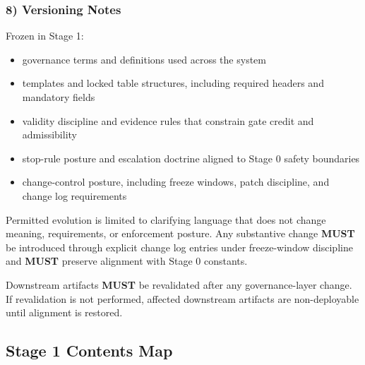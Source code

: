 \documentclass[10pt]{article}
\begin{document}
\subsubsection*{8) Versioning Notes}

Frozen in Stage 1:

\begin{itemize}
\item governance terms and definitions used across the system
\item templates and locked table structures, including required headers and mandatory fields
\item validity discipline and evidence rules that constrain gate credit and admissibility
\item stop-rule posture and escalation doctrine aligned to Stage 0 safety boundaries
\item change-control posture, including freeze windows, patch discipline, and change log requirements
\end{itemize}

Permitted evolution is limited to clarifying language that does not change meaning, requirements, or enforcement posture. Any substantive change \textbf{MUST} be introduced through explicit change log entries under freeze-window discipline and \textbf{MUST} preserve alignment with Stage 0 constants.

Downstream artifacts \textbf{MUST} be revalidated after any governance-layer change. If revalidation is not performed, affected downstream artifacts are non-deployable until alignment is restored.

\subsection*{Stage 1 Contents Map}
{}
\end{document}
